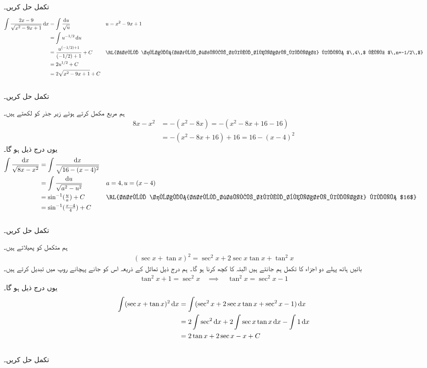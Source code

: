 \\
تکمل  حل کریں۔

\begin{align*}
\int\frac{2x-9}{\sqrt{x^2-9x+1}}\dif x&=\int\frac{\dif u}{\sqrt{u}}&&u=x^2-9x+1\\
&=\int u^{-1/2}\dif u\\
&=\frac{u^{(-1/2)+1}}{(-1/2)+1}+C&&\text{\RL{جدول \حوالہ{جدول_طریقے_تکمل_بنیادی_کلیات} کلیہ $\,4\,$ میں $\,n=-1/2\,$}}\\
&=2u^{1/2}+C\\
&=2\sqrt{x^2-9x+1}+C
\end{align*}
\\
تکمل  حل کریں۔

ہم مربع مکمل کرتے ہوئے زیر جذر کو لکھتے ہیں۔
\begin{align*}
8x-x^2&=-(x^2-8x)=-(x^2-8x+16-16)\\
&=-(x^2-8x+16)+16=16-(x-4)^2
\end{align*}
یوں درج ذیل ہو گا۔
\begin{align*}
\int\frac{\dif x}{\sqrt{8x-x^2}}&=\int\frac{\dif x}{\sqrt{16-(x-4)^2}}\\
&=\int\frac{\dif u}{\sqrt{a^2-u^2}}&&a=4,u=(x-4)\\
&=\sin^{-1}(\tfrac{u}{a})+C&&\text{\RL{جدول \حوالہ{جدول_طریقے_تکمل_بنیادی_کلیات} کلیہ $16$}}\\
&=\sin^{-1}(\tfrac{x-4}{4})+C
\end{align*}
\\
تکمل  حل کریں۔

ہم متکمل کو پھیلاتے ہیں۔
\begin{align*}
(\sec x+\tan x)^2=\sec^2x+2\sec x\tan x+\tan^2x
\end{align*}
بائیں ہاتھ پہلے دو اجزاء کا تکمل ہم جانتے ہیں البتہ  کا کچھ کرنا ہو گا۔ ہم درج ذیل تماثل کے ذریعہ اس کو جانے  پہچانے  روپ میں تبدیل کرتے ہیں۔
\begin{align*}
\tan^2x+1=\sec^2x\quad \implies\quad \tan^2x=\sec^2x-1
\end{align*}
یوں درج ذیل ہو گا۔
\begin{align*}
\int (\sec x+\tan x)^2\dif x&=\int(\sec^2x+2\sec x\tan x+\sec^2x-1)\dif x\\
&=2\int \sec^2\dif x+2\int\sec x\tan x\dif x-\int 1\dif x\\
&=2\tan x+2\sec x-x+C
\end{align*}
\\
تکمل  حل کریں۔


